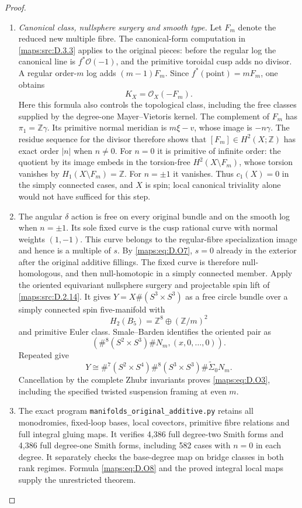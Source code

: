 \begin{proof}
\begin{enumerate}[label=\arabic*.,leftmargin=*]
\item \emph{Canonical class, nullsphere surgery and smooth type.}
Let $F_m$ denote the reduced new multiple fibre.
The canonical-form computation in \ref{maps:src:D.3.3} applies to the
original pieces: before the regular log the canonical
line is $f^*\mathcal O(-1)$, and the primitive toroidal
cusp adds no divisor. A regular order-$m$ log adds
$(m-1)F_m$. Since $f^*(\mathrm{point})=mF_m$, one obtains
\[
                         K_X=\mathcal O_X(-F_m).
 \tag{D.O9}\label{maps:eq:D.O9}
\]
Here this formula also controls the topological class,
including the free classes supplied by the degree-one
Mayer--Vietoris kernel. The complement of $F_m$ has
$\pi_1=\mathbb Z\gamma$. Its primitive normal meridian
is $m\xi-v$, whose image is $-n\gamma$.
The residue sequence for the divisor therefore shows
that $[F_m]\in H^2(X;\mathbb Z)$ has exact order $|n|$
when $n\ne0$. For $n=0$ it is primitive of infinite
order: the quotient by its image embeds in the torsion-free
$H^2(X\setminus F_m)$, whose torsion vanishes by
$H_1(X\setminus F_m)=\mathbb Z$. For $n=\pm1$ it vanishes. Thus $c_1(X)=0$ in the
simply connected cases, and $X$ is spin; local canonical
triviality alone would not have sufficed for this step.

\item The angular $\delta$ action is free on every original
bundle and on the smooth log when $n=\pm1$. Its sole
fixed curve is the cusp rational curve with normal
weights $(1,-1)$. This curve belongs to the regular-fibre
specialization image and hence is a multiple of $s$.
By \eqref{maps:eq:D.O7}, $s=0$ already in the exterior after the
original additive fillings. The fixed curve is therefore
null-homologous, and then null-homotopic in a simply
connected member.
Apply the oriented equivariant nullsphere surgery and
projectable spin lift of \ref{maps:src:D.2.14}. It gives
$Y=X\#(S^3\times S^3)$ as a free circle bundle over a
simply connected spin five-manifold with
\[
            H_2(B_5)=\mathbb Z^8\oplus(\mathbb Z/m)^2
\]
and primitive Euler class. Smale--Barden identifies the
oriented pair as
\[
 (\#^8(S^2\times S^3)\#N_m,(x,0,\ldots,0)).
\]
Repeated \cite[Theorem A and Theorem B(2)]{manGR25}
give
\[
 Y\cong\#^7(S^2\times S^4)\#^8(S^3\times S^3)
                                        \#\widetilde\Sigma_0N_m.
\]
Cancellation by the complete Zhubr invariants proves
\eqref{maps:eq:D.O3}, including the specified twisted suspension
framing at even $m$.

\item The exact program \texttt{manifolds\_original\_additive.py}
retains all monodromies, fixed-loop bases, local covectors,
primitive fibre relations and full integral gluing maps.
It verifies 4,386 full degree-two Smith forms and 4,386
full degree-one Smith forms, including 582 cases with
$n=0$ in each degree. It separately checks the base-degree
map on bridge classes in both rank regimes. Formula
\eqref{maps:eq:D.O8} and the proved integral local maps supply the
unrestricted theorem.
\end{enumerate}
\end{proof}

